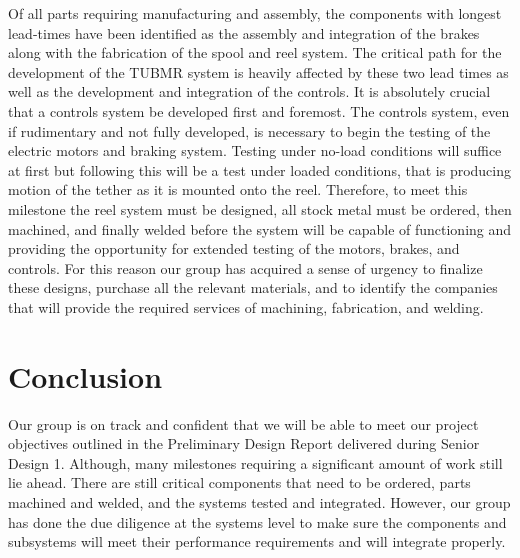 Of all parts requiring manufacturing and assembly, the components with longest lead-times have been identified as the assembly and integration of the brakes along with the fabrication of the spool and reel system. The critical path for the development of the TUBMR system is heavily affected by these two lead times as well as the development and integration of the controls. It is absolutely crucial that a controls system be developed first and foremost. The controls system, even if rudimentary and not fully developed, is necessary to begin the testing of the electric motors and braking system. Testing under no-load conditions will suffice at first but following this will be a test under loaded conditions, that is producing motion of the tether as it is mounted onto the reel. Therefore, to meet this milestone the reel system must be designed, all stock metal must be ordered, then machined, and finally welded before the system will be capable of functioning and providing the opportunity for extended testing of the motors, brakes, and controls. For this reason our group has acquired a sense of urgency to finalize these designs, purchase all the relevant materials, and to identify the companies that will provide the required services of machining, fabrication, and welding.









\section{Conclusion}

\indent\indent Our group is on track and confident that we will be able to meet our project objectives outlined in the Preliminary Design Report delivered during Senior Design 1. Although, many milestones requiring a significant amount of work still lie ahead. There are still critical components that need to be ordered, parts machined and welded, and the systems tested and integrated. However, our group has done the due diligence at the systems level to make sure the components and subsystems will meet their performance requirements and will integrate properly.


